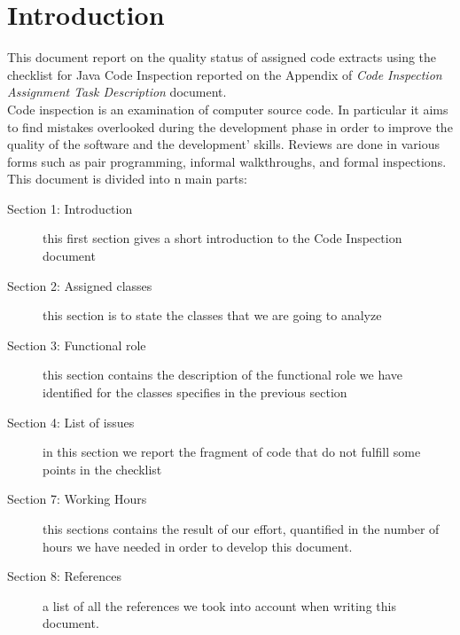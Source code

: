 \section{Introduction}
This document report on the quality status of assigned code extracts using the checklist for Java Code Inspection reported on the Appendix of \textit{Code Inspection Assignment Task Description} document.\\
Code inspection is an examination of computer source code. In particular it aims to find mistakes overlooked during the development phase in order to improve the quality of the software and the development' skills. Reviews are done in various forms such as pair programming, informal walkthroughs, and formal inspections.\\

This document is divided into n main parts:
\begin{description}
	\item[Section 1: Introduction]
		this first section gives a short introduction to the Code Inspection document
	\item[Section 2: Assigned classes]
		this section is to state the classes that we are going to analyze
	\item[Section 3: Functional role] 
		this section contains the description of the functional role we have identified for the classes specifies in the previous section
	\item[Section 4: List of issues] 
		in this section we report the fragment of code that do not fulfill some points in the checklist
	\item[Section 7: Working Hours] 
		this sections contains the result of our effort, quantified in the number of hours we have needed in order to develop this document. 
	\item[Section 8: References] 
		a list of all the references we took into account when writing this document.
\end{description}